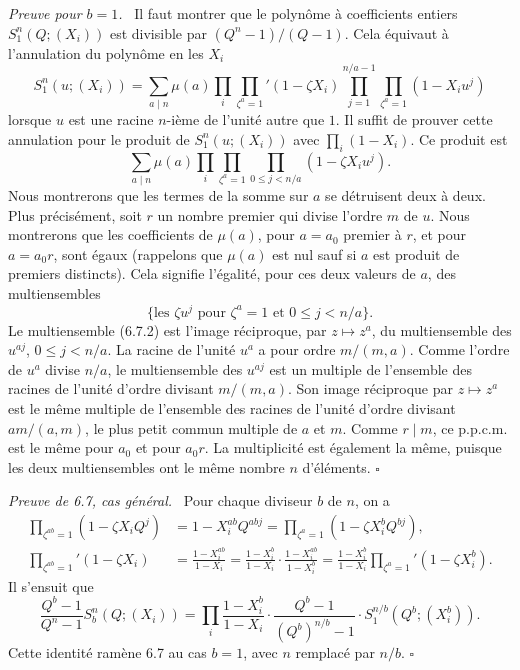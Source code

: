 \documentclass[10pt]{article}
\theoremstyle{deligne}
\newenvironment{proofdel}[1][Preuve.]{\textit{#1}\ }{\hfill$\square$}
\begin{document}
\begin{proofdel}[Preuve pour $b=1$.]
Il faut montrer que le polynôme à coefficients entiers $S_1^n(Q;(X_i))$ est divisible par $(Q^n-1)/(Q-1)$. Cela équivaut à l'annulation du polynôme en les $X_i$
\[
S_1^n(u;(X_i))=\sum_{a\mid n}\mu(a)\prod_i\prod_{\zeta^a=1}'(1-\zeta X_i)
\prod_{j=1}^{n/a-1}\prod_{\zeta^a=1}(1-X_iu^j)
\]
lorsque $u$ est une racine $n$-ième de l'unité autre que $1$. Il suffit de prouver cette annulation pour le produit de $S_1^n(u;(X_i))$ avec $\prod_i(1-X_i)$. Ce produit est
\begin{equation}\tag{6.7.1}
\sum_{a\mid n}\mu(a)\prod_i\prod_{\zeta^a=1}\prod_{0\le j<n/a}(1-\zeta X_i u^j).
\end{equation}
Nous montrerons que les termes de la somme sur $a$ se détruisent deux à deux. Plus précisément, soit $r$ un nombre premier qui divise l'ordre $m$ de $u$. Nous montrerons que les coefficients de $\mu(a)$, pour $a=a_0$ premier à $r$, et pour $a=a_0r$, sont égaux (rappelons que $\mu(a)$ est nul sauf si $a$ est produit de premiers distincts). Cela signifie l'égalité, pour ces deux valeurs de $a$, des multiensembles
\begin{equation}\tag{6.7.2}
\{\text{les }\zeta u^j\text{ pour }\zeta^a=1\text{ et }0\le j<n/a\}.
\end{equation}
Le multiensemble (6.7.2) est l'image réciproque, par $z\mapsto z^a$, du multiensemble des $u^{aj}$, $0\le j<n/a$. La racine de l'unité $u^a$ a pour ordre $m/(m,a)$. Comme l'ordre de $u^a$ divise $n/a$, le multiensemble des $u^{aj}$ est un multiple de l'ensemble des racines de l'unité d'ordre divisant $m/(m,a)$. Son image réciproque par $z\mapsto z^a$ est le même multiple de l'ensemble des racines de l'unité d'ordre divisant $am/(a,m)$, le plus petit commun multiple de $a$ et $m$. Comme $r\mid m$, ce p.p.c.m. est le même pour $a_0$ et pour $a_0r$. La multiplicité est également la même, puisque les deux multiensembles ont le même nombre $n$ d'éléments.
\end{proofdel}

\begin{proofdel}[Preuve de 6.7, cas général.]
Pour chaque diviseur $b$ de $n$, on a
\begin{align*}
\prod_{\zeta^{ab}=1}(1-\zeta X_iQ^j)&=1-X_i^{ab}Q^{abj}=\prod_{\zeta^a=1}(1-\zeta X_i^bQ^{bj}),\\
\prod_{\zeta^{ab}=1}'(1-\zeta X_i)&=\frac{1-X_i^{ab}}{1-X_i}
=\frac{1-X_i^b}{1-X_i}\cdot\frac{1-X_i^{ab}}{1-X_i^b}
=\frac{1-X_i^b}{1-X_i}\prod_{\zeta^a=1}'(1-\zeta X_i^b).
\end{align*}
Il s'ensuit que
\[
\frac{Q^b-1}{Q^n-1}S_b^n(Q;(X_i))
=\prod_i\frac{1-X_i^b}{1-X_i}\cdot
\frac{Q^b-1}{(Q^b)^{n/b}-1}\cdot S_1^{n/b}(Q^b;(X_i^b)).
\]
Cette identité ramène 6.7 au cas $b=1$, avec $n$ remplacé par $n/b$.
\end{proofdel}
\end{document}
